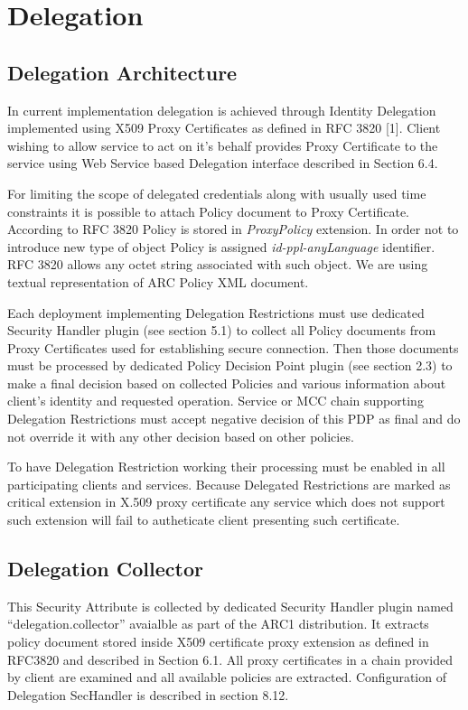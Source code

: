 \documentclass{book}
\begin{document}



\section{Delegation} %
\label{sec:delegation}

\subsection{Delegation Architecture} %
\label{subsec:delegation_arch}
In current implementation delegation is achieved through Identity Delegation implemented using X509 Proxy Certificates as defined in RFC 3820 [1]. Client wishing to allow service to act on it's behalf provides Proxy Certificate to the service using Web Service based Delegation interface described in Section 6.4.

For limiting the scope of delegated credentials along with usually used time constraints it is possible to attach Policy document to Proxy Certificate. According to RFC 3820 Policy is stored in \textit{ProxyPolicy} extension. In order not to introduce new type of object Policy is assigned \textit{id-ppl-anyLanguage} identifier. RFC 3820 allows any octet string associated with such object. We are using textual representation of ARC Policy XML document.

Each deployment implementing Delegation Restrictions must use dedicated Security Handler plugin (see section 5.1) to collect all Policy documents from Proxy Certificates used for establishing secure connection. Then those documents must be processed by dedicated Policy Decision Point plugin (see section 2.3) to make a final decision based on collected Policies and various information about client's identity and requested operation. Service or MCC chain supporting Delegation Restrictions must accept negative decision of this PDP as final and do not override it with any other decision based on other policies.

To have Delegation Restriction working their processing must be enabled in all participating clients and services. Because Delegated Restrictions are marked as critical extension in X.509 proxy certificate any  service which does not support such extension will fail to autheticate client presenting such certificate.

\subsection{Delegation Collector} %
\label{subsec:delegation_collector}
This Security Attribute is collected by dedicated Security Handler plugin named ``delegation.collector'' avaialble as part of the ARC1 distribution. It extracts policy document stored inside X509 certificate proxy extension as defined in RFC3820 and described in Section 6.1. All proxy certificates in a chain provided by client are examined and all available policies are extracted. Configuration of Delegation SecHandler is described in section 8.12.
\end{document}
